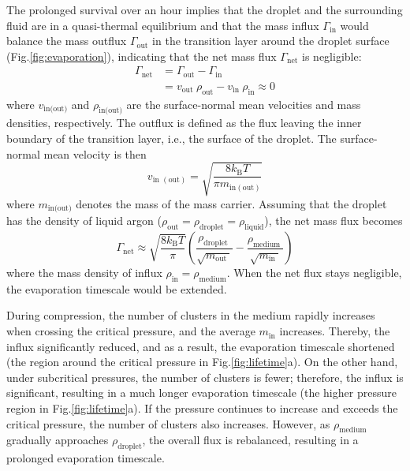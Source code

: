 The prolonged survival over an hour implies that the droplet and the surrounding fluid are in a quasi-thermal equilibrium and that the mass influx $\Gamma_\text{in}$  would balance the mass outflux $\Gamma_\text{out}$ in the transition layer around the droplet surface (Fig.\ref{fig:evaporation}), indicating that the net mass flux $\Gamma_\text{net}$  is negligible:
\begin{equation}
\begin{aligned}
\Gamma_{\text{net}} &= \Gamma_{\text{out}} - \Gamma_{\text{in}} \\
&= v_{\text{out }} \rho_{\text{out}} - v_{\text{in }} \rho_{\text{in}} \approx 0
\end{aligned}
\end{equation}
where $v_\text{in(out)}$  and $\rho_\text{in(out)}$ are the surface-normal mean velocities and mass densities, respectively. The outflux is defined as the flux leaving the inner boundary of the transition layer, i.e., the surface of the droplet. The surface-normal mean velocity is then
\begin{equation}
v_{\text {in }(\mathrm{out})}=\sqrt{\frac{8 k_{\mathrm{B}} T}{\pi m_{\mathrm{in}(\mathrm{out})}}}
\end{equation}
where $m_\text{in(out)}$ denotes the mass of the mass carrier. Assuming that the droplet has the density of liquid argon  ($\rho_\text{out} = \rho_\text{droplet} = \rho_\text{liquid}$), the net mass flux becomes
\begin{equation}
\Gamma_{\mathrm{net}} \approx \sqrt{\frac{8 k_{\mathrm{B}} T}{\pi}}\left(\frac{\rho_{\text {droplet }}}{\sqrt{m_{\text {out }}}}-\frac{\rho_{\text {medium }}}{\sqrt{m_{\text {in }}}}\right)
\end{equation}
where the mass density of influx $\rho_\text{in} = \rho_\text{medium}$. When the net flux stays negligible, the evaporation timescale would be extended.

During compression, the number of clusters in the medium rapidly increases when crossing the critical pressure, and the average $m_\text{in}$ increases. Thereby, the influx significantly reduced, and as a result, the evaporation timescale shortened (the region around the critical pressure in Fig.\ref{fig:lifetime}a). On the other hand, under subcritical pressures, the number of clusters is fewer; therefore, the influx is significant, resulting in a much longer evaporation timescale (the higher pressure region in Fig.\ref{fig:lifetime}a). If the pressure continues to increase and exceeds the critical pressure, the number of clusters also increases. However, as $\rho_\text{medium}$ gradually approaches $\rho_\text{droplet}$, the overall flux is rebalanced, resulting in a prolonged evaporation timescale.


